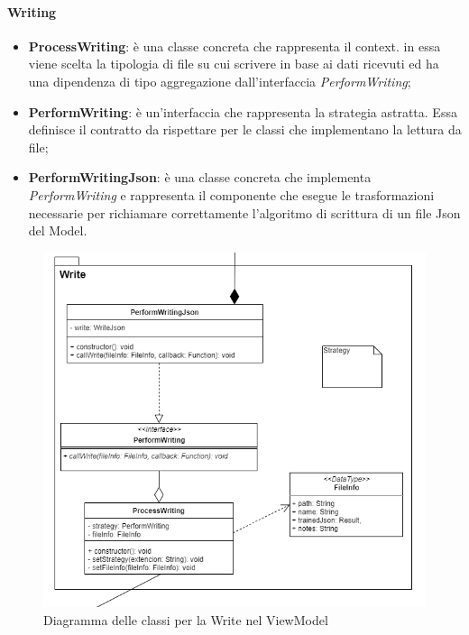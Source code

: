		\paragraph*{Writing} \mbox{}
		\begin{itemize}
			\item \textbf{ProcessWriting}: è una classe concreta che rappresenta il context. in essa viene scelta la tipologia di file su cui scrivere in base ai dati ricevuti ed ha una dipendenza di tipo aggregazione dall'interfaccia \textit{PerformWriting};
			\item \textbf{PerformWriting}: è un'interfaccia che rappresenta la strategia astratta. Essa definisce il contratto da rispettare per le classi che implementano la lettura da file;
			\item \textbf{PerformWritingJson}: è una classe concreta che implementa \textit{PerformWriting} e rappresenta il componente che esegue le trasformazioni necessarie per richiamare correttamente l'algoritmo di scrittura di un file Json del Model.
		\end{itemize}
		\mbox{}
				\begin{figure} [H]
					\includegraphics[width=\linewidth]{img/Diagrammi/ViewModel-write-app.png}
					\caption{Diagramma delle classi per la Write nel ViewModel}
				\end{figure}
		
